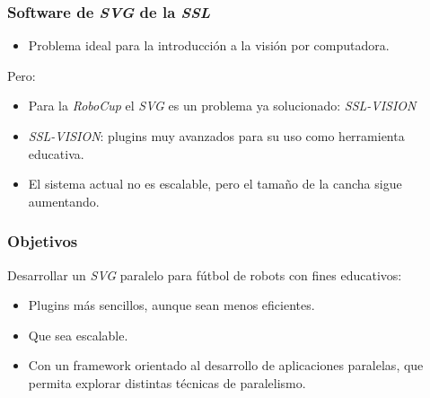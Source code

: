 \documentclass[11pt,a4paper,spanish]{beamer}
\begin{document}
\begin{frame}

\frametitle{Software de \emph{SVG} de la \emph{SSL}}

\begin{itemize}

	\item Problema ideal para la introducción a la visión por computadora.

\end{itemize}

Pero:

\begin{itemize}

	\item Para la \emph{RoboCup} el \emph{SVG} es un problema ya
		solucionado: \emph{SSL-VISION}

	\item \emph{SSL-VISION}: plugins muy avanzados para su uso como
		herramienta educativa.

	\item El sistema actual no es escalable, pero el tamaño de la cancha
		sigue aumentando.

\end{itemize}

\end{frame}

\begin{frame}

\frametitle{Objetivos}

Desarrollar un \emph{SVG} paralelo para fútbol de robots con fines educativos:

\begin{itemize}

	\item Plugins más sencillos, aunque sean menos eficientes.

	\item Que sea escalable.

	\item Con un framework orientado al desarrollo de aplicaciones
		paralelas, que permita explorar distintas técnicas de
		paralelismo.

\end{itemize}

\end{frame}
\end{document}
